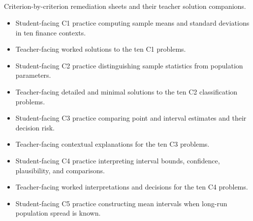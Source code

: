 \subsection{}

Criterion-by-criterion remediation sheets and their teacher solution companions.

\begin{itemize}
  \item {}

  Student-facing C1 practice computing sample means and standard deviations in ten finance contexts.

  \item {}

  Teacher-facing worked solutions to the ten C1 problems.

  \item {}

  Student-facing C2 practice distinguishing sample statistics from population parameters.

  \item {}

  Teacher-facing detailed and minimal solutions to the ten C2 classification problems.

  \item {}

  Student-facing C3 practice comparing point and interval estimates and their decision risk.

  \item {}

  Teacher-facing contextual explanations for the ten C3 problems.

  \item {}

  Student-facing C4 practice interpreting interval bounds, confidence, plausibility, and comparisons.

  \item {}

  Teacher-facing worked interpretations and decisions for the ten C4 problems.

  \item {}

  Student-facing C5 practice constructing mean intervals when long-run population spread is known.


\end{itemize}
